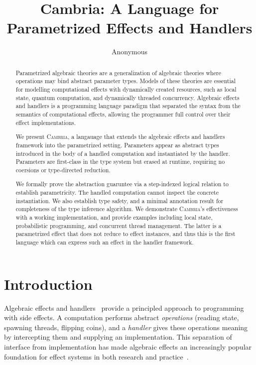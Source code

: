 \documentclass[acmsmall,screen,review,anonymous]{acmart}
\newcommand{\cambria}{\textsc{Cambria}}
\begin{document}
\title{Cambria: A Language for Parametrized Effects and Handlers}

\author{Anonymous}

\begin{abstract}
Parametrized algebraic theories are a generalization of algebraic theories where operations may bind abstract parameter types.
Models of these theories are essential for modelling computational effects with dynamically created resources, such as local state,
quantum computation, and dynamically threaded concurrency.
Algebraic effects and handlers is a programming language paradigm that separated the syntax from the semantics of computational effects,
allowing the programmer full control over their effect implementations.

We present \cambria{}, a langauage that extends the algebraic effects and handlers framework into the parametrized setting.
Parameters appear as abstract types introduced in the body of a handled computation and instantiated by the handler.
Parameters are first-class in the type system but erased at runtime, requiring no coersions or type-directed reduction.

We formally prove the abstraction guaruntee via a step-indexed logical relation to establish parametricity.
The handled computation cannot inspect the concrete instantiation.
We also establish type safety, and a minimal annotation result for completeness of the type inference algorithm.
We demonstrate \cambria{}'s effectiveness with a working implementation, and provide examples including local state,
probabilistic programming, and concurrent thread management. The latter is a parametrized effect that does not reduce to
effect instances, and thus this is the first language which can express such an effect in the handler framework.
\end{abstract}

\maketitle

\section{Introduction}\label{sec:intro}

Algebraic effects and handlers~\cite{plotkin_handling_2009} provide a principled approach to programming with side effects. A computation performs abstract \emph{operations} (reading state, spawning threads, flipping coins), and a \emph{handler} gives these operations meaning by intercepting them and supplying an implementation. This separation of interface from implementation has made algebraic effects an increasingly popular foundation for effect systems in both research and practice~\cite{bauer_programming_2015, hillerström_continuation_2017, leijen_koka_2014}.
\end{document}
